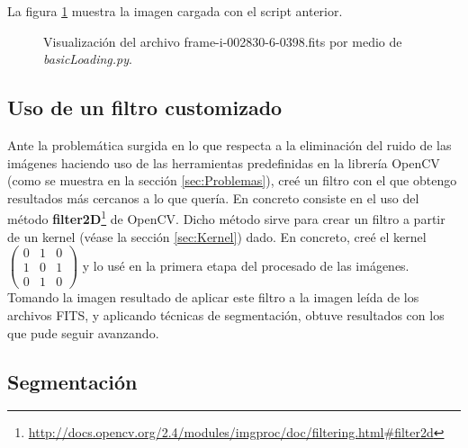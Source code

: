 \documentclass[a4paper,12pt]{article}
\begin{document}
La figura \ref{fig:img1} muestra la imagen cargada con el script anterior.
\begin{figure}[h!]
\centering
{}
\caption{Visualización del archivo frame-i-002830-6-0398.fits por medio de \textit{basicLoading.py}.}
\label{fig:img1}
\end{figure}

\subsection{Uso de un filtro customizado}

Ante la problemática surgida en lo que respecta a la eliminación del ruido de las imágenes haciendo uso de las herramientas predefinidas en la librería OpenCV (como se muestra en la sección \ref{sec:Problemas}), creé un filtro con el que obtengo resultados más cercanos a lo que quería. En concreto consiste en el uso del método \textbf{filter2D}\footnote{\url{http://docs.opencv.org/2.4/modules/imgproc/doc/filtering.html#filter2d}} de OpenCV. Dicho método sirve para crear un filtro a partir de un kernel (véase la sección \ref{sec:Kernel}) dado.
En concreto, creé el kernel
$\begin{pmatrix}
0 & 1 & 0 \\
1 & 0 & 1 \\
0 & 1 & 0
\end{pmatrix}$
y lo usé en la primera etapa del procesado de las imágenes.
Tomando la imagen resultado de aplicar este filtro a la imagen leída de los archivos FITS, y aplicando técnicas de segmentación, obtuve resultados con los que pude seguir avanzando.

\subsection{Segmentación}
\end{document}
